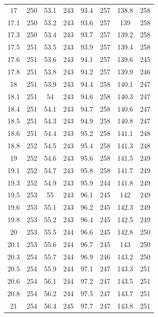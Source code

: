 \documentclass[12pt]{ctexart}
\numberwithin{equation}{section}
\begin{document}
\begin{longtable}{cc|cc|cc|cc}
17  &  250  &  53.1  &  243  &  93.4  &  257  &  138.8  &  258  \\
17.1  &  250  &  53.2  &  243  &  93.6  &  257  &  139  &  258  \\
17.3  &  250  &  53.4  &  243  &  93.7  &  257  &  139.2  &  258  \\
17.5  &  251  &  53.5  &  243  &  93.9  &  257  &  139.4  &  258  \\
17.6  &  251  &  53.6  &  243  &  94.1  &  257  &  139.6  &  245  \\
17.8  &  251  &  53.8  &  243  &  94.2  &  257  &  139.9  &  246  \\
18  &  251  &  53.9  &  243  &  94.4  &  258  &  140.1  &  247  \\
18.1  &  251  &  54  &  243  &  94.6  &  258  &  140.3  &  247  \\
18.4  &  251  &  54.1  &  243  &  94.7  &  258  &  140.6  &  247  \\
18.5  &  251  &  54.3  &  243  &  94.9  &  258  &  140.8  &  247  \\
18.6  &  251  &  54.4  &  243  &  95.2  &  258  &  141.1  &  248  \\
18.8  &  252  &  54.5  &  243  &  95.4  &  258  &  141.3  &  248  \\
19  &  252  &  54.6  &  243  &  95.6  &  258  &  141.5  &  249  \\
19.1  &  252  &  54.7  &  243  &  95.8  &  258  &  141.7  &  249  \\
19.3  &  252  &  54.9  &  243  &  95.9  &  244  &  141.8  &  249  \\
19.5  &  253  &  55  &  243  &  96.1  &  245  &  142  &  249  \\
19.6  &  253  &  55.1  &  243  &  96.2  &  245  &  142.3  &  249  \\
19.8  &  253  &  55.2  &  243  &  96.4  &  245  &  142.5  &  249  \\
20  &  253  &  55.5  &  244  &  96.6  &  245  &  142.8  &  250  \\
20.1  &  253  &  55.6  &  244  &  96.7  &  245  &  143  &  250  \\
20.3  &  254  &  55.7  &  244  &  96.9  &  246  &  143.2  &  250  \\
20.5  &  254  &  55.9  &  244  &  97.1  &  247  &  143.3  &  251  \\
20.6  &  254  &  56.1  &  244  &  97.2  &  247  &  143.5  &  251  \\
20.8  &  254  &  56.2  &  244  &  97.5  &  247  &  143.7  &  251  \\
21  &  254  &  56.4  &  245  &  97.7  &  247  &  143.8  &  251  \\

\end{longtable}
\end{document}
